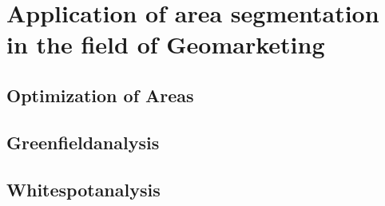 \section{Application of area segmentation in the field of Geomarketing}

\subsection{Optimization of Areas}
\subsection{Greenfieldanalysis}
\subsection{Whitespotanalysis}